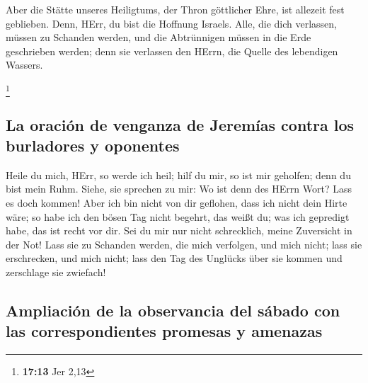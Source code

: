  Aber die Stätte unseres Heiligtums, der Thron göttlicher
Ehre, ist allezeit fest geblieben.  Denn, HErr, du bist
die Hoffnung Israels. Alle, die dich verlassen, müssen zu Schanden
werden, und die Abtrünnigen müssen in die Erde geschrieben werden; denn
sie verlassen den HErrn, die Quelle des lebendigen Wassers.

\footnote{\textbf{17:13} Jer 2,13}

\hypertarget{la-oraciuxf3n-de-venganza-de-jeremuxedas-contra-los-burladores-y-oponentes}{%
\subsection{La oración de venganza de Jeremías contra los burladores y
oponentes}\label{la-oraciuxf3n-de-venganza-de-jeremuxedas-contra-los-burladores-y-oponentes}}

 Heile du mich, HErr, so werde ich heil; hilf du mir, so
ist mir geholfen; denn du bist mein Ruhm.  Siehe, sie
sprechen zu mir: Wo ist denn des HErrn Wort? Lass es doch kommen!
 Aber ich bin nicht von dir geflohen, dass ich nicht dein
Hirte wäre; so habe ich den bösen Tag nicht begehrt, das weißt du; was
ich gepredigt habe, das ist recht vor dir.  Sei du mir
nur nicht schrecklich, meine Zuversicht in der Not!  Lass
sie zu Schanden werden, die mich verfolgen, und mich nicht; lass sie
erschrecken, und mich nicht; lass den Tag des Unglücks über sie kommen
und zerschlage sie zwiefach!

\hypertarget{ampliaciuxf3n-de-la-observancia-del-suxe1bado-con-las-correspondientes-promesas-y-amenazas}{%
\subsection{Ampliación de la observancia del sábado con las
correspondientes promesas y
amenazas}\label{ampliaciuxf3n-de-la-observancia-del-suxe1bado-con-las-correspondientes-promesas-y-amenazas}}

